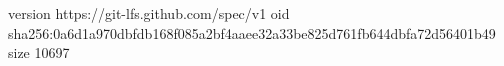 version https://git-lfs.github.com/spec/v1
oid sha256:0a6d1a970dbfdb168f085a2bf4aaee32a33be825d761fb644dbfa72d56401b49
size 10697
